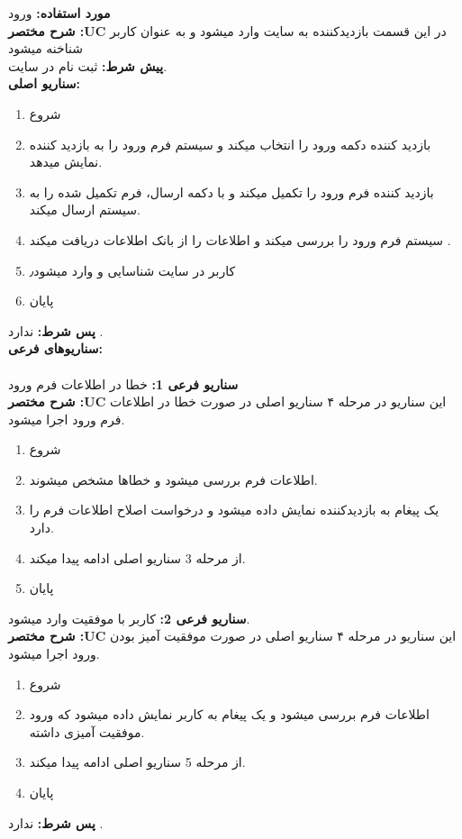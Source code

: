 \documentclass[20pt,a5paper]{report}
\begin{document}
\noindent \textbf{مورد استفاده:}
ورود
\\
\textbf{شرح مختصر :UC}
در این قسمت بازدیدکننده به سایت وارد میشود و به عنوان کاربر شناخنه میشود
\\
\textbf{پيش شرط:}
ثبت نام در سایت.
\\
\textbf{سناريو اصلی:}
\begin{enumerate}
\item 
شروع
\item 
بازدید کننده دکمه ورود را انتخاب میکند و سیستم فرم ورود را به بازدید کننده نمایش میدهد.
\item 
بازدید کننده فرم ورود را تکمیل میکند و با دکمه ارسال، فرم تکمیل شده را به سیستم ارسال میکند.
\item 
سیستم فرم ورود را بررسی میکند و اطلاعات را از بانک اطلاعات دریافت میکند .
\item 
کاربر در سایت شناسایی و وارد میشود٫
\item 
پایان
\end{enumerate}
\textbf{پس شرط:}
ندارد .
\\
\textbf{سناريوهای فرعی:}
\\ \\
\textbf{سناريو فرعی 1:}
خطا در اطلاعات فرم ورود
\\
\textbf{شرح مختصر :UC}
این سناریو در مرحله ۴ سناریو اصلی در صورت خطا در اطلاعات فرم ورود اجرا میشود.
\begin{enumerate}
\item 
شروع
\item 
اطلاعات فرم بررسی میشود و خطاها مشخص میشوند.
\item 
یک پیغام به بازدیدکننده نمایش داده میشود و درخواست اصلاح اطلاعات فرم را دارد.
\item 
از مرحله 3 سناریو اصلی ادامه پیدا میکند.
\item 
پایان
\end{enumerate}
\textbf{سناريو فرعی 2:}
کاربر با موفقیت وارد میشود.
\\
\textbf{شرح مختصر :UC}
این سناریو در مرحله ۴ سناریو اصلی در صورت موفقیت آمیز بودن ورود اجرا میشود.
\begin{enumerate}
\item 
شروع
\item 
اطلاعات فرم بررسی میشود و یک پیغام به کاربر نمایش داده میشود که ورود موفقیت آمیزی داشته.
\item 
از مرحله 5 سناریو اصلی ادامه پیدا میکند.
\item 
پایان
\end{enumerate}

\textbf{پس شرط:}
ندارد .


\centering
\vfill
\lr{\LaTeX}
\end{document}
